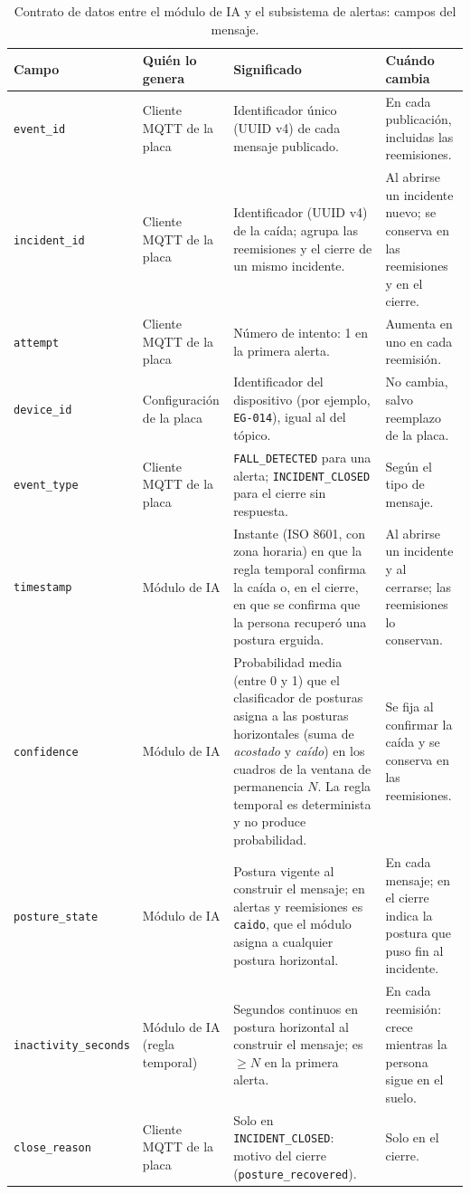 \documentclass[12pt,a4paper,oneside]{book}
\theoremstyle{plain}
\theoremstyle{definition}
\theoremstyle{remark}
\begin{document}
\begin{table}[H]
\centering
\caption{Contrato de datos entre el módulo de IA y el subsistema de alertas: campos del mensaje.}
\label{tab:contrato-ia-iot}
\footnotesize
\begin{tabular}{L{2.9cm}L{2.0cm}L{5.0cm}L{3.2cm}}
\toprule
\textbf{Campo} & \textbf{Quién lo genera} & \textbf{Significado} & \textbf{Cuándo cambia} \\
\midrule
\texttt{event\_id} & Cliente MQTT de la placa & Identificador único (UUID v4) de cada mensaje publicado. & En cada publicación, incluidas las reemisiones. \\
\addlinespace
\texttt{incident\_id} & Cliente MQTT de la placa & Identificador (UUID v4) de la caída; agrupa las reemisiones y el cierre de un mismo incidente. & Al abrirse un incidente nuevo; se conserva en las reemisiones y en el cierre. \\
\addlinespace
\texttt{attempt} & Cliente MQTT de la placa & Número de intento: 1 en la primera alerta. & Aumenta en uno en cada reemisión. \\
\addlinespace
\texttt{device\_id} & Configuración de la placa & Identificador del dispositivo (por ejemplo, \texttt{EG-014}), igual al del tópico. & No cambia, salvo reemplazo de la placa. \\
\addlinespace
\texttt{event\_type} & Cliente MQTT de la placa & \texttt{FALL\_DETECTED} para una alerta; \texttt{INCIDENT\_CLOSED} para el cierre sin respuesta. & Según el tipo de mensaje. \\
\addlinespace
\texttt{timestamp} & Módulo de IA & Instante (ISO 8601, con zona horaria) en que la regla temporal confirma la caída o, en el cierre, en que se confirma que la persona recuperó una postura erguida. & Al abrirse un incidente y al cerrarse; las reemisiones lo conservan. \\
\addlinespace
\texttt{confidence} & Módulo de IA & Probabilidad media (entre 0 y 1) que el clasificador de posturas asigna a las posturas horizontales (suma de \textit{acostado} y \textit{caído}) en los cuadros de la ventana de permanencia $N$. La regla temporal es determinista y no produce probabilidad. & Se fija al confirmar la caída y se conserva en las reemisiones. \\
\addlinespace
\texttt{posture\_state} & Módulo de IA & Postura vigente al construir el mensaje; en alertas y reemisiones es \texttt{caido}, que el módulo asigna a cualquier postura horizontal. & En cada mensaje; en el cierre indica la postura que puso fin al incidente. \\
\addlinespace
\texttt{inactivity\_seconds} & Módulo de IA (regla temporal) & Segundos continuos en postura horizontal al construir el mensaje; es $\geq N$ en la primera alerta. & En cada reemisión: crece mientras la persona sigue en el suelo. \\
\addlinespace
\texttt{close\_reason} & Cliente MQTT de la placa & Solo en \texttt{INCIDENT\_CLOSED}: motivo del cierre (\texttt{posture\_recovered}). & Solo en el cierre. \\
\bottomrule
\end{tabular}
\end{table}
\end{document}
